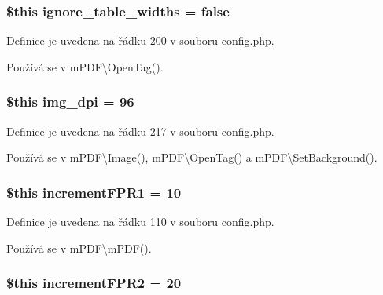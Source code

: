 \hypertarget{config_8php_af52ac00a7b5e1e81ed7c7ab2e87e6dd4}{
\subsubsection[{ignore\-\_\-table\-\_\-widths}]{\setlength{\rightskip}{0pt plus 5cm}\$this ignore\-\_\-table\-\_\-widths = {\bf false}}}\label{config_8php_af52ac00a7b5e1e81ed7c7ab2e87e6dd4}


Definice je uvedena na řádku 200 v souboru config.\-php.



Používá se v m\-P\-D\-F\textbackslash{}\-Open\-Tag().

\hypertarget{config_8php_a385982a1af7184091c58976ccae42518}{
\subsubsection[{img\-\_\-dpi}]{\setlength{\rightskip}{0pt plus 5cm}\$this img\-\_\-dpi = 96}}\label{config_8php_a385982a1af7184091c58976ccae42518}


Definice je uvedena na řádku 217 v souboru config.\-php.



Používá se v m\-P\-D\-F\textbackslash{}\-Image(), m\-P\-D\-F\textbackslash{}\-Open\-Tag() a m\-P\-D\-F\textbackslash{}\-Set\-Background().

\hypertarget{config_8php_ab5eb8661b7d2890c798e8d6d9f47944e}{
\subsubsection[{increment\-F\-P\-R1}]{\setlength{\rightskip}{0pt plus 5cm}\$this increment\-F\-P\-R1 = 10}}\label{config_8php_ab5eb8661b7d2890c798e8d6d9f47944e}


Definice je uvedena na řádku 110 v souboru config.\-php.



Používá se v m\-P\-D\-F\textbackslash{}m\-P\-D\-F().

\hypertarget{config_8php_a071e4f33e2427747f1e558624497e7bf}{
\subsubsection[{increment\-F\-P\-R2}]{\setlength{\rightskip}{0pt plus 5cm}\$this increment\-F\-P\-R2 = 20}}\label{config_8php_a071e4f33e2427747f1e558624497e7bf}


